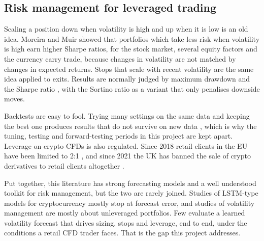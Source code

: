 \subsection{Risk management for leveraged trading}

Scaling a position down when volatility is high and up when it is low is an old idea. Moreira and Muir \cite{moreira2017} showed that portfolios which take less risk when volatility is high earn higher Sharpe ratios, for the stock market, several equity factors and the currency carry trade, because changes in volatility are not matched by changes in expected returns. Stops that scale with recent volatility are the same idea applied to exits. Results are normally judged by maximum drawdown and the Sharpe ratio \cite{sharpe1994}, with the Sortino ratio \cite{sortino1994} as a variant that only penalises downside moves.

Backtests are easy to fool. Trying many settings on the same data and keeping the best one produces results that do not survive on new data \cite{bailey2014}, which is why the tuning, testing and forward-testing periods in this project are kept apart. Leverage on crypto CFDs is also regulated. Since 2018 retail clients in the EU have been limited to 2:1 \cite{esma2018}, and since 2021 the UK has banned the sale of crypto derivatives to retail clients altogether \cite{fca2020}.

Put together, this literature has strong forecasting models and a well understood toolkit for risk management, but the two are rarely joined. Studies of LSTM-type models for cryptocurrency mostly stop at forecast error, and studies of volatility management are mostly about unleveraged portfolios. Few evaluate a learned volatility forecast that drives sizing, stops and leverage, end to end, under the conditions a retail CFD trader faces. That is the gap this project addresses.

